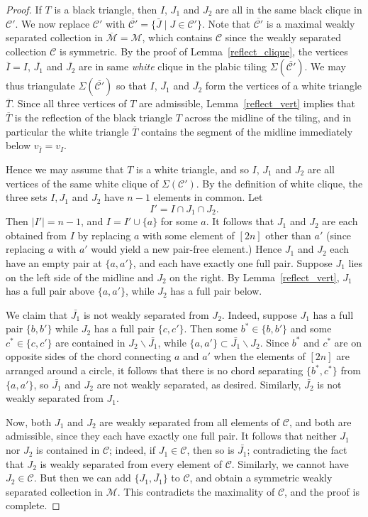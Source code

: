 \documentclass[ALCO,ThmDefs,Unicode,epreuves]{cedram}
\begin{document}
\begin{proof}
If $T$ is a black triangle, then $I$, $J_1$ and $J_2$ are all in the same black clique in $\mathcal{C}'$. We now replace $\mathcal{C}'$ with $\overline{\mathcal{C}'} = \{\bar{J} \mid J \in \mathcal{C}'\}$. Note that $\overline{\mathcal{C}'}$ is a maximal weakly separated collection in $\overline{\mathcal{M}} = \mathcal{M}$, which contains $\mathcal{C}$ since the weakly separated collection $\mathcal{C}$ is symmetric. By the proof of Lemma~\ref{reflect_clique}, the vertices $\overline{I}=I$, $\overline{J_1}$ and $\overline{J_2}$ are in same \emph{white} clique in the plabic tiling $\Sigma(\overline{\mathcal{C}'})$. We may thus triangulate $\Sigma(\overline{\mathcal{C}'})$ so that $I$, $\overline{J_1}$ and $\overline{J_2}$ form the vertices of a white triangle $\overline{T}$. Since all three vertices of $T$ are admissible, Lemma~\ref{reflect_vert} implies that $\overline{T}$ is the reflection of the black triangle $T$ across the midline of the tiling, and in particular the white triangle $\overline{T}$ contains the segment of the midline immediately below $v_{\bar{I}} = v_{I}$. 

Hence we may assume that $T$ is a white triangle, and so $I$, $J_1$ and $J_2$ are all vertices of the same white clique of $\Sigma(\mathcal{C}')$. By the definition of white clique, the three sets $I,J_1$ and $J_2$ have $n-1$ elements in common. Let
\[I' = I \cap J_1 \cap J_2.\]
Then $|I'| = n-1$, and $I = I' \cup \{a\}$ for some $a$. 
It follows that $J_1$ and $J_2$ are each obtained from $I$ by replacing $a$ with some element of $[2n]$ other than $a'$ (since replacing $a$ with $a'$ would yield a new pair-free element.) Hence $J_1$ and $J_2$ each have an empty pair at $\{a,a'\}$, and each have exactly one full pair. Suppose $J_1$ lies on the left side of the midline and $J_2$ on the right. By Lemma~\ref{reflect_vert}, $J_1$ has a full pair above $\{a,a'\}$, while $J_2$ has a full pair below. 

We claim that $\bar{J_1}$ is not weakly separated from $J_2$. Indeed, suppose $J_1$ has a full pair $\{b,b'\}$ while $J_2$ has a full pair $\{c, c'\}$. Then some $b^* \in \{b, b'\}$ and some $c^* \in \{c,c'\}$ are contained in $J_2 \backslash \bar{J_1}$, while $\{a,a'\} \subset \bar{J_1} \backslash J_2$. 
Since $b^*$ and $c^*$ are on opposite sides of the chord connecting $a$ and $a'$ when the elements of $[2n]$ are arranged around a circle, it follows that there is no chord separating $\{b^*, c^*\}$ from $\{a,a'\}$, so
$\bar{J_1}$ and $J_2$ are not weakly separated, as desired. 
Similarly, $\bar{J_2}$ is not weakly separated from $J_1$.

Now, both $J_1$ and $J_2$ are weakly separated from all elements of $\mathcal{C}$, and both are admissible, since they each have exactly one full pair. It follows that neither $J_1$ nor $J_2$ is contained in $\mathcal{C}$; indeed, if $J_1 \in \mathcal{C}$, then so is $\bar{J_1}$; contradicting the fact that $J_2$ is weakly separated from every element of $\mathcal{C}$. Similarly, we cannot have $J_2 \in \mathcal{C}$. But then we can add $\{J_1, \bar{J_1}\}$ to $\mathcal{C}$, and obtain a symmetric weakly separated collection in $\mathcal{M}$. This contradicts the maximality of $\mathcal{C}$, and the proof is complete.\end{proof}
\end{document}
